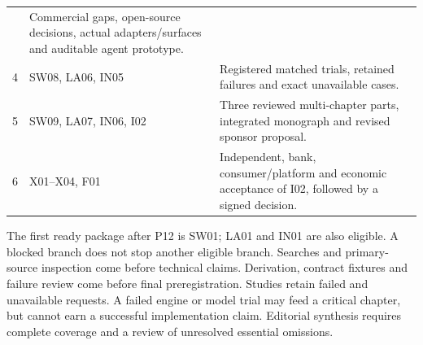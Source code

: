 \documentclass[
  11pt,
  a4paper,
]{article}
\begin{document}
\begin{longtable}[]{@{}lll@{}}
\begin{minipage}[t]{0.30\columnwidth}
\end{minipage} & \begin{minipage}[t]{0.30\columnwidth}\raggedright
Commercial gaps, open-source decisions, actual adapters/surfaces and
auditable agent prototype.\strut
\end{minipage}\tabularnewline
\begin{minipage}[t]{0.30\columnwidth}\raggedright
4\strut
\end{minipage} & \begin{minipage}[t]{0.30\columnwidth}\raggedright
SW08, LA06, IN05\strut
\end{minipage} & \begin{minipage}[t]{0.30\columnwidth}\raggedright
Registered matched trials, retained failures and exact unavailable
cases.\strut
\end{minipage}\tabularnewline
\begin{minipage}[t]{0.30\columnwidth}\raggedright
5\strut
\end{minipage} & \begin{minipage}[t]{0.30\columnwidth}\raggedright
SW09, LA07, IN06, I02\strut
\end{minipage} & \begin{minipage}[t]{0.30\columnwidth}\raggedright
Three reviewed multi-chapter parts, integrated monograph and revised
sponsor proposal.\strut
\end{minipage}\tabularnewline
\begin{minipage}[t]{0.30\columnwidth}\raggedright
6\strut
\end{minipage} & \begin{minipage}[t]{0.30\columnwidth}\raggedright
X01--X04, F01\strut
\end{minipage} & \begin{minipage}[t]{0.30\columnwidth}\raggedright
Independent, bank, consumer/platform and economic acceptance of I02,
followed by a signed decision.\strut
\end{minipage}\tabularnewline
\bottomrule
\end{longtable}

The first ready package after P12 is SW01; LA01 and IN01 are also
eligible. A blocked branch does not stop another eligible branch.
Searches and primary-source inspection come before technical claims.
Derivation, contract fixtures and failure review come before final
preregistration. Studies retain failed and unavailable requests. A
failed engine or model trial may feed a critical chapter, but cannot
earn a successful implementation claim. Editorial synthesis requires
complete coverage and a review of unresolved essential omissions.
\end{document}
